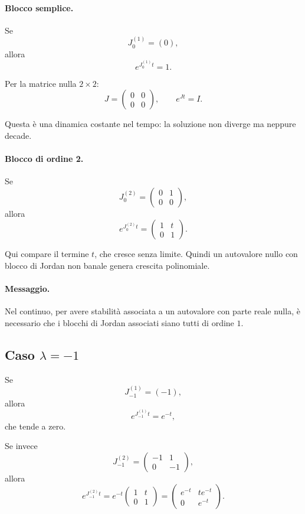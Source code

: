 \paragraph{Blocco semplice.}
Se
\[
J_0^{(1)}=(0),
\]
allora
\[
e^{J_0^{(1)}t}=1.
\]

Per la matrice nulla $2\times 2$:
\[
J=
\begin{pmatrix}
0 & 0\\
0 & 0
\end{pmatrix},
\qquad
e^{Jt}=I.
\]

Questa è una dinamica costante nel tempo: la soluzione non diverge ma neppure decade.

\paragraph{Blocco di ordine 2.}
Se
\[
J_0^{(2)}=
\begin{pmatrix}
0 & 1\\
0 & 0
\end{pmatrix},
\]
allora
\[
e^{J_0^{(2)}t}
=
\begin{pmatrix}
1 & t\\
0 & 1
\end{pmatrix}.
\]

Qui compare il termine $t$, che cresce senza limite.  
Quindi un autovalore nullo con blocco di Jordan non banale genera crescita polinomiale.

\paragraph{Messaggio.}
Nel continuo, per avere stabilità associata a un autovalore con parte reale nulla, è necessario che i blocchi di Jordan associati siano tutti di ordine $1$.

\subsection{Caso \texorpdfstring{$\lambda=-1$}{lambda=-1}}

Se
\[
J_{-1}^{(1)}=(-1),
\]
allora
\[
e^{J_{-1}^{(1)}t}=e^{-t},
\]
che tende a zero.

Se invece
\[
J_{-1}^{(2)}=
\begin{pmatrix}
-1 & 1\\
0 & -1
\end{pmatrix},
\]
allora
\[
e^{J_{-1}^{(2)}t}
=
e^{-t}
\begin{pmatrix}
1 & t\\
0 & 1
\end{pmatrix}
=
\begin{pmatrix}
e^{-t} & te^{-t}\\
0 & e^{-t}
\end{pmatrix}.
\]

